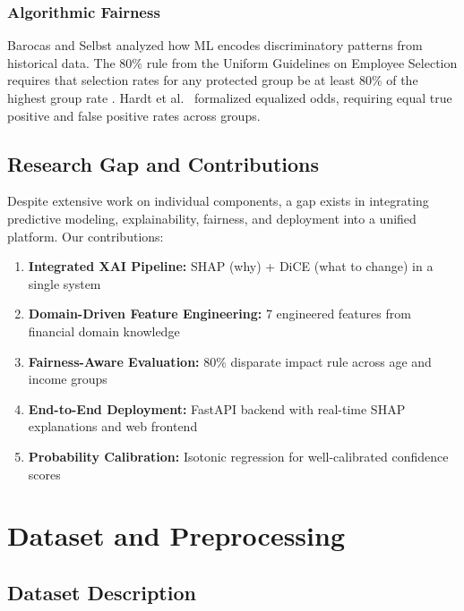 \documentclass[journal]{IEEEtran}
\begin{document}
\subsubsection{Algorithmic Fairness}
Barocas and Selbst \cite{barocas2016} analyzed how ML encodes discriminatory patterns from historical data. The 80\% rule from the Uniform Guidelines on Employee Selection requires that selection rates for any protected group be at least 80\% of the highest group rate \cite{biddle2006}. Hardt et al.\ \cite{hardt2016} formalized equalized odds, requiring equal true positive and false positive rates across groups.


\subsection{Research Gap and Contributions}

Despite extensive work on individual components, a gap exists in integrating predictive modeling, explainability, fairness, and deployment into a unified platform. Our contributions:

\begin{enumerate}[nosep]
  \item \textbf{Integrated XAI Pipeline:} SHAP (why) + DiCE (what to change) in a single system
  \item \textbf{Domain-Driven Feature Engineering:} 7 engineered features from financial domain knowledge
  \item \textbf{Fairness-Aware Evaluation:} 80\% disparate impact rule across age and income groups
  \item \textbf{End-to-End Deployment:} FastAPI backend with real-time SHAP explanations and web frontend
  \item \textbf{Probability Calibration:} Isotonic regression for well-calibrated confidence scores
\end{enumerate}


\section{Dataset and Preprocessing}

\subsection{Dataset Description}
\end{document}
